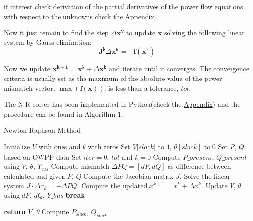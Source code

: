 \documentclass[a4paper,11pt, titlepage, twoside]{article}
\begin{document}
if interest check derivation of the partial derivatives of the power flow equations with respect to the unknowns check the \hyperref[Appendix]{Appendix}.

Now it just remain to find the step $\Delta \mathbf{x^v}$ to update $\mathbf{x}$ solving the following linear system by Gauss elimination:
\begin{equation}
    \mathbf{J^k}\Delta \mathbf{x^k} = -\mathbf{f(x^k)}
\end{equation}

Now we update $\mathbf{x^{k+1}}=\mathbf{x^{k}}+\Delta \mathbf{x^k}$ and iterate until it converges. The convergence criteria is usually set as the maximum of the absolute value of the power mismatch vector, $\max(\mathbf{f(x)})$, is less than a tolerance, $tol$.







The N-R solver has been implemented in Python(check the \hyperref[Appendix]{Appendix}) and the procedure can be found in Algorithm 1.
\begin{algorithm}[H]
    \caption{Newton-Raphson Method}
    \begin{algorithmic}
        \State Initialize $V$ with ones and $\theta$ with zeros
        \Statex \hspace{\algorithmicindent}Set $V[slack$] to $1$, $\theta[slack]$ to $0$
        \Statex \hspace{\algorithmicindent}Set $P_{}$, $Q_{}$ based on OWPP data
        \Statex \hspace{\algorithmicindent}Set $iter = 0 $, $tol$ and $k = 0$
            \State Compute $P\_present$, $Q\_present$ using $V$, $\theta$, $Y_{bus}$
            \State Compute mismatch $\Delta PQ = [dP, dQ]$ as difference between calculated and given $P$, $Q$
            \State Compute the Jacobian matrix $J$.
            \State Solve the linear system $J \cdot \Delta x_k = -\Delta PQ$.
            \State Compute the updated $x^{k+1} = x^{k} + \Delta x^k $.
            \State Update $V$, $\theta$ using $dP$, $dQ$, $Y\_bus$
                \State \textbf{break}
            \EndIf
            
        \EndWhile
        \State \textbf{return} $V$, $\theta$
        \State Compute $P_{slack}$, $Q_{slack}$
    \EndProcedure
    \end{algorithmic}
    \end{algorithm}
\end{document}
